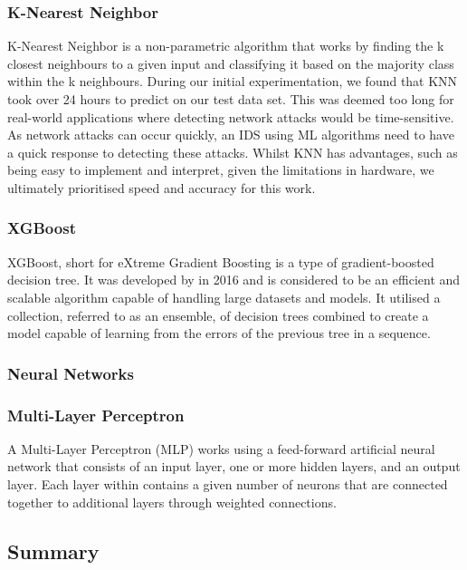 \subsubsection{K-Nearest Neighbor}

K-Nearest Neighbor is a non-parametric algorithm that works by finding the k closest neighbours to a given input and classifying it based on the majority class within the k neighbours. 
During our initial experimentation, we found that KNN took over 24 hours to predict on our test data set. This was deemed too long for real-world applications where detecting network attacks would be time-sensitive. As network attacks can occur quickly, an IDS using ML algorithms need to have a quick response to detecting these attacks.
Whilst KNN has advantages, such as being easy to implement and interpret, given the limitations in hardware, we ultimately prioritised speed and accuracy for this work. 

\subsubsection{XGBoost}

XGBoost, short for eXtreme Gradient Boosting is a type of gradient-boosted decision tree. It was developed by \citeauthor{XGBoost} in 2016 and is considered to be an efficient and scalable algorithm capable of handling large datasets and models. It utilised a collection, referred to as an ensemble, of decision trees combined to create a model capable of learning from the errors of the previous tree in a sequence. 

\subsubsection{Neural Networks}

\subsubsection*{Multi-Layer Perceptron}

A Multi-Layer Perceptron (MLP) works using a feed-forward artificial neural network that consists of an input layer, one or more hidden layers, and an output layer. Each layer within contains a given number of neurons that are connected together to additional layers through weighted connections. 


\subsection{Summary}

